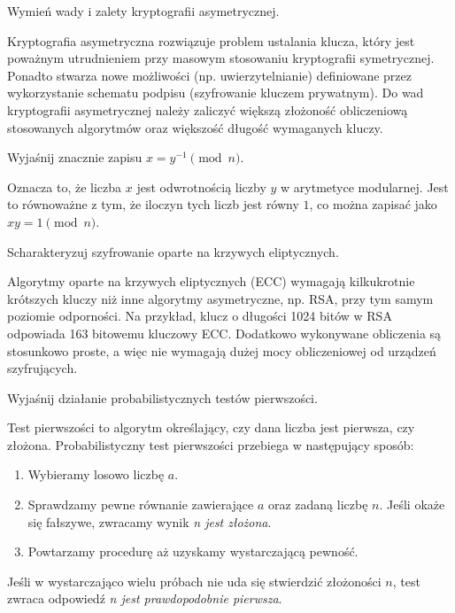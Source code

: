\documentclass[answers,11pt]{exam}
\begin{document}
\begin{questions}
\question Wymień wady i zalety kryptografii asymetrycznej.
\begin{solution}
Kryptografia asymetryczna rozwiązuje problem ustalania klucza, który jest poważnym utrudnieniem przy masowym stosowaniu kryptografii symetrycznej. Ponadto stwarza nowe możliwości (np. uwierzytelnianie) definiowane przez wykorzystanie schematu podpisu (szyfrowanie kluczem prywatnym). Do wad kryptografii asymetrycznej należy zaliczyć większą złożoność obliczeniową stosowanych algorytmów oraz większość długość wymaganych kluczy.
\end{solution}


\question Wyjaśnij znacznie zapisu $x = y^{-1} \pmod{n}$.
\begin{solution}
Oznacza to, że liczba $x$ jest odwrotnością liczby $y$ w arytmetyce modularnej. Jest to równoważne z tym, że iloczyn tych liczb jest równy $1$, co można zapisać jako $x y = 1 \pmod{n}$.
\end{solution}

\question Scharakteryzuj szyfrowanie oparte na krzywych eliptycznych.
\begin{solution}
Algorytmy oparte na krzywych eliptycznych (ECC) wymagają kilkukrotnie krótszych kluczy niż inne algorytmy asymetryczne, np. RSA, przy tym samym poziomie odporności. Na przykład, klucz o długości 1024 bitów w RSA odpowiada 163 bitowemu kluczowy ECC.
Dodatkowo wykonywane obliczenia są stosunkowo proste, a więc nie wymagają dużej mocy obliczeniowej od urządzeń szyfrujących.
\end{solution}

\question Wyjaśnij działanie probabilistycznych testów pierwszości.
\begin{solution}
Test pierwszości to algorytm określający, czy dana liczba jest pierwsza, czy złożona. Probabilistyczny test pierwszości przebiega w następujący sposób:
\begin{enumerate}
\item Wybieramy losowo liczbę $a$.
\item Sprawdzamy pewne równanie zawierające $a$ oraz zadaną liczbę $n$. Jeśli okaże się fałszywe, zwracamy wynik \textit{n jest złożona}.
\item Powtarzamy procedurę aż uzyskamy wystarczającą pewność.
\end{enumerate}
Jeśli w wystarczająco wielu próbach nie uda się stwierdzić złożoności $n$, test zwraca odpowiedź \textit{n jest prawdopodobnie pierwsza}.
\end{solution}


\end{questions}
\end{document}
